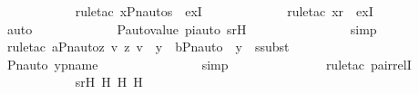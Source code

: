 \begin{isabellebody}
\ \ \ \ \ \ \ \ \ \ \isamarkupfalse%
\ {\isacharparenleft}{\kern0pt}rule{\isacharunderscore}{\kern0pt}tac\ x{\isacharequal}{\kern0pt}{\isachardoublequoteopen}Pn{\isacharunderscore}{\kern0pt}auto{\isacharparenleft}{\kern0pt}{\isasympi}{\isacharparenright}{\kern0pt}{\isacharbackquote}{\kern0pt}s{\isachardoublequoteclose}\ \ exI{\isacharparenright}{\kern0pt}\ \isanewline
\ \ \ \ \ \ \ \ \ \ \isamarkupfalse%
\ {\isacharparenleft}{\kern0pt}rule{\isacharunderscore}{\kern0pt}tac\ x{\isacharequal}{\kern0pt}{\isachardoublequoteopen}{\isasympi}{\isacharbackquote}{\kern0pt}r{\isachardoublequoteclose}\ \ exI{\isacharparenright}{\kern0pt}\ \isanewline
\ \ \ \ \ \ \ \ \ \ \isamarkupfalse%
\ {\isacharparenleft}{\kern0pt}auto{\isacharparenright}{\kern0pt}\ \isanewline
\ \ \ \ \ \ \ \ \ \ \isamarkupfalse%
\ P{\isacharunderscore}{\kern0pt}auto{\isacharunderscore}{\kern0pt}value\ piauto\ srH\ \isanewline
\ \ \ \ \ \ \ \ \ \ \ \ \ \isamarkupfalse%
\ simp\ \isanewline
\ \ \ \ \ \ \ \ \ \ \isamarkupfalse%
\ {\isacharparenleft}{\kern0pt}rule{\isacharunderscore}{\kern0pt}tac\ a{\isacharequal}{\kern0pt}{\isachardoublequoteopen}{\isacharbraceleft}{\kern0pt}{\isacharless}{\kern0pt}Pn{\isacharunderscore}{\kern0pt}auto{\isacharparenleft}{\kern0pt}{\isasympi}{\isacharparenright}{\kern0pt}{\isacharbackquote}{\kern0pt}z{\isacharcomma}{\kern0pt}\ {\isasympi}{\isacharbackquote}{\kern0pt}v{\isachargreater}{\kern0pt}{\isachardot}{\kern0pt}\ {\isacharless}{\kern0pt}z{\isacharcomma}{\kern0pt}\ v{\isachargreater}{\kern0pt}\ {\isasymin}\ y{\isacharbraceright}{\kern0pt}{\isachardoublequoteclose}\ \ b{\isacharequal}{\kern0pt}{\isachardoublequoteopen}Pn{\isacharunderscore}{\kern0pt}auto{\isacharparenleft}{\kern0pt}{\isasympi}{\isacharparenright}{\kern0pt}\ {\isacharbackquote}{\kern0pt}\ y{\isachardoublequoteclose}\ \ ssubst{\isacharparenright}{\kern0pt}\isanewline
\ \ \ \ \ \ \ \ \ \ \isamarkupfalse%
\ Pn{\isacharunderscore}{\kern0pt}auto\ ypname\ \isanewline
\ \ \ \ \ \ \ \ \ \ \ \ \ \isamarkupfalse%
\ simp\ \isanewline
\ \ \ \ \ \ \ \ \ \ \ \ \isamarkupfalse%
\ {\isacharparenleft}{\kern0pt}rule{\isacharunderscore}{\kern0pt}tac\ pair{\isacharunderscore}{\kern0pt}relI{\isacharparenright}{\kern0pt}\ \isanewline
\ \ \ \ \ \ \ \ \ \ \isamarkupfalse%
\ srH\ H\ H{}\ H{}\ \isanewline
\ \ \ \ \ \ \ \ \ \ \ \ \isamarkupfalse%

\end{isabellebody}

